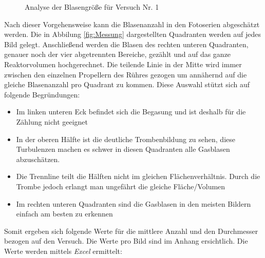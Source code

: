 \documentclass[12pt,liststotoc]{report}
\begin{document}
\begin{figure}[H]
\begin{center}
	\hspace{1cm}
	\label{blasengroesse6}
	\caption{Analyse der Blasengröße für Versuch Nr. 1}
	\label{Fotoserie1}
\end{center}	
\end{figure}
\noindent
Nach dieser Vorgehensweise kann die Blasenanzahl in den Fotoserien abgeschätzt werden. Die in Abbilung \ref{fig:Messung} dargestellten Quadranten werden auf jedes Bild gelegt. Anschließend werden die Blasen des rechten unteren Quadranten, genauer noch der vier abgetrennten Bereiche, gezählt und auf das ganze Reaktorvolumen hochgerechnet. Die teilende Linie in der Mitte wird immer zwischen den einzelnen Propellern des Rühres gezogen um annähernd auf die gleiche Blasenanzahl pro Quadrant zu kommen. Diese Auswahl stützt sich auf folgende Begründungen: 

\begin{itemize}
    \item Im linken unteren Eck befindet sich die Begasung und ist deshalb für die Zählung  nicht geeignet
    \item In der oberen Hälfte ist die deutliche Trombenbildung zu sehen, diese Turbulenzen machen es schwer in diesen Quadranten alle Gasblasen abzuschätzen.
    \item Die Trennline teilt die Hälften nicht im gleichen Flächenverhältnis. Durch die Trombe jedoch erlangt man ungefährt die gleiche Fläche/Volumen
    \item Im rechten unteren Quadranten sind die Gasblasen in den meisten Bildern einfach am besten zu erkennen
\end{itemize}

Somit ergeben sich folgende Werte für die mittlere Anzahl und den Durchmesser bezogen auf den Versuch. Die Werte pro Bild sind im Anhang ersichtlich. Die Werte werden mittels \textit{\textit{Excel}} ermittelt:
\end{document}
